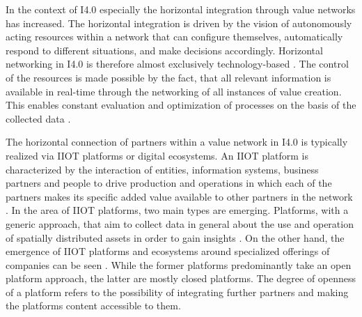 In the context of \ac{I4.0} especially the horizontal integration through value networks has increased. The horizontal integration is driven by the vision of autonomously acting resources within a network that can configure themselves, automatically respond to different situations, and make decisions accordingly. Horizontal networking in \ac{I4.0} is therefore almost exclusively technology-based \cite[p. 20, 21]{Acatech2013Recommendations4.0}. The control of the resources is made possible by the fact, that all relevant information is available in real-time through the networking of all instances of value creation. This enables constant evaluation and optimization of processes on the basis of the collected data \cite[p. 24]{Acatech2013Recommendations4.0}. 

The horizontal connection of partners within a value network in \ac{I4.0} is typically realized via \ac{IIOT} platforms or digital ecosystems. An \ac{IIOT} platform is characterized by the interaction of entities, information systems, business partners and people to drive production and operations in which each of the partners makes its specific added value available to other partners in the network \cite[p. 5]{Falk2020ValueChina} \cite[p. 2]{Falk2021DigitaleEntwicklung}. In the area of \ac{IIOT} platforms, two main types are emerging. Platforms, with a generic approach, that aim to collect data in general about the use and operation of spatially distributed assets in order to gain insights \cite[p. 11]{Falk2021DigitaleEntwicklung}. On the other hand, the emergence of \ac{IIOT} platforms and ecosystems around specialized offerings of companies can be seen \cite[p. 13]{Falk2021DigitaleEntwicklung}. While the former platforms predominantly take an open platform approach, the latter are mostly closed platforms. The degree of openness of a platform refers to the possibility of integrating further partners and making the platforms content accessible to them. 

